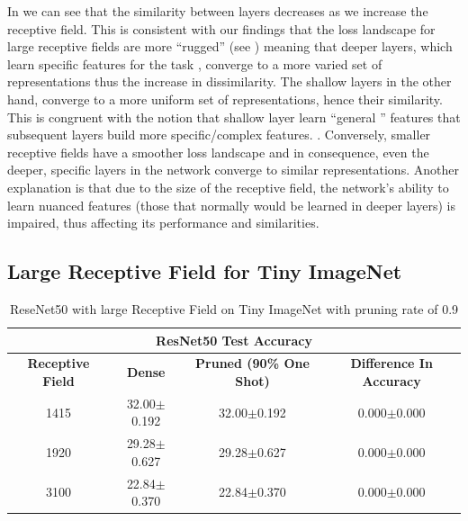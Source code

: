 In  we can see that the similarity between layers decreases as we increase the receptive
field. This is consistent with our findings that the loss landscape for large receptive fields are more ``rugged''
(see )
meaning that deeper layers, which learn specific features for the task \citep{yosinskiHowTransferableAre2014, roAutoLRLayerwisePruning2021}, converge to a more varied set of representations thus the
increase in dissimilarity. The shallow layers in the other hand, converge to a
more uniform set of representations, hence their similarity. This is congruent with the notion that shallow layer learn
``general '' features that subsequent layers build more specific/complex features. \citep{roAutoLRLayerwisePruning2021}.
Conversely, smaller receptive fields have a smoother loss landscape and in consequence, even the deeper, specific layers
in the network converge to similar representations. Another explanation is that due to the size of the receptive
field, the network's ability to learn nuanced features (those that normally would be learned in deeper layers) is
impaired, thus affecting its performance and similarities.

\subsection{Large Receptive Field for Tiny ImageNet}
\label{subsec:LargeRFTI}
\begin{table}[H]
  \centering
\begin{tabular}{@{}cccc@{}}\toprule
\multicolumn{4}{c}{\textbf{ResNet50 Test Accuracy}}                                            \\ \midrule
\textbf{Receptive Field} & \textbf{Dense}  & \textbf{Pruned (90\% One Shot)} & \textbf{Difference In Accuracy} \\ \midrule
1415                     & 32.00$\pm$0.192 & 32.00$\pm$0.192 & 0.000$\pm$0.000                 \\
1920                     & 29.28$\pm$0.627 & 29.28$\pm$0.627 & 0.000$\pm$0.000                 \\
3100                     & 22.84$\pm$0.370 & 22.84$\pm$0.370 & 0.000$\pm$0.000                 \\ \bottomrule
\end{tabular}
\caption{ReseNet50 with large Receptive Field on Tiny ImageNet  with pruning rate of 0.9}
\label{tab:tiny imagenet largeRF one shot pruning rate 09}
\end{table}

